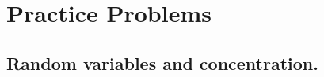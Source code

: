\documentclass[10pt]{article}
\newcommand{\R}{\mathbb{R}}
\begin{document}

	
	\section{Practice Problems}
	
	\subsection{Random variables and concentration.}
	
\end{document}
